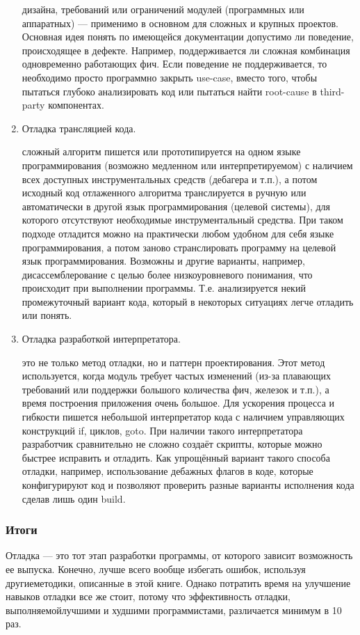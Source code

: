 \documentclass[a4paper]{article}
\begin{document}
\begin{enumerate}
        дизайна, требований или ограничений модулей (программных или аппаратных) — применимо в основном для сложных и крупных проектов. Основная идея понять по имеющейся документации допустимо ли поведение, происходящее в дефекте. Например, поддерживается ли сложная комбинация одновременно работающих фич. Если  поведение не поддерживается, то необходимо просто программно закрыть use-case, вместо того, чтобы пытаться глубоко анализировать код или пытаться найти root-cause в third-party компонентах.
  \item Отладка трансляцией кода.

        сложный алгоритм пишется или прототипируется на одном языке программирования (возможно медленном или интерпретируемом) с наличием всех доступных инструментальных средств (дебагера и т.п.), а потом исходный код отлаженного алгоритма транслируется в ручную или автоматически в другой язык программирования (целевой системы), для которого отсутствуют необходимые инструментальный средства. При таком подходе отладится можно на практически любом удобном для себя языке программирования, а потом заново странслировать программу на целевой язык программирования. Возможны и другие варианты, например,  дисассемблерование с целью более низкоуровневого понимания, что происходит при выполнении программы. Т.е. анализируется некий промежуточный вариант кода, который в некоторых ситуациях легче отладить или понять.
  \item Отладка разработкой интерпретатора.

        это не только метод отладки, но и паттерн проектирования. Этот метод используется, когда модуль требует частых изменений (из-за плавающих требований или поддержки большого количества фич, железок и т.п.), а время построения приложения очень большое. Для ускорения процесса и гибкости пишется небольшой интерпретатор кода с наличием управляющих конструкций if, циклов, goto. При наличии такого интерпретатора разработчик сравнительно не сложно создаёт скрипты, которые  можно быстрее исправить и отладить. Как упрощённый вариант такого способа отладки, например, использование дебажных флагов в коде, которые конфигурируют код и позволяют проверить разные варианты исполнения кода сделав лишь один build.
\end{enumerate}

\subsubsection{Итоги}

Отладка  —  это  тот  этап  разработки  программы,  от  которого  зависит  возможность ее выпуска. Конечно, лучше всего вообще избегать ошибок, используя другиеметодики,  описанные  в  этой  книге.  Однако  потратить  время  на  улучшение  навыков  отладки  все  же  стоит,  потому  что  эффективность  отладки,  выполняемойлучшими  и  худшими  программистами,  различается  минимум  в  10  раз.
\end{document}

